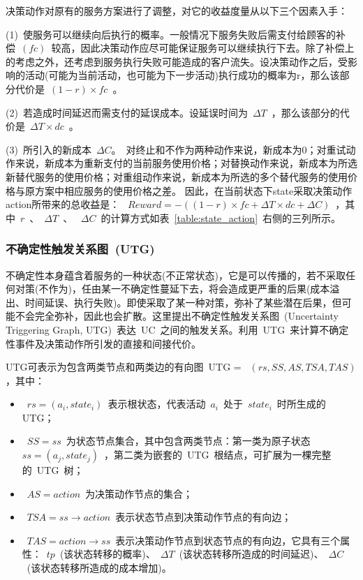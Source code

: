 决策动作对原有的服务方案进行了调整，对它的收益度量从以下三个因素入手：

(1)~使服务可以继续向后执行的概率。一般情况下服务失败后需支付给顾客的补偿~$(fc)$~较高，因此决策动作应尽可能保证服务可以继续执行下去。除了补偿上的考虑之外，还考虑到服务执行失败可能造成的客户流失。设决策动作之后，受影响的活动(可能为当前活动，也可能为下一步活动)执行成功的概率为r，那么该部分代价是~$(1-r) \times fc$~。

(2)~若造成时间延迟而需支付的延误成本。设延误时间为~$\Delta T$~，那么该部分的代价是~$\Delta T \times dc$~。

(3)~所引入的新成本~$\Delta C$。~对终止和不作为两种动作来说，新成本为0；对重试动作来说，新成本为重新支付的当前服务使用价格；对替换动作来说，新成本为所选新替代服务的使用价格；对重组动作来说，新成本为所选的多个替代服务的使用价格与原方案中相应服务的使用价格之差。
因此，在当前状态下state采取决策动作action所带来的总收益是：
~$Reward =  - ((1 - r) \times fc + \Delta T \times dc + \Delta C)$~，其中~$r$~、~$\Delta T$~、 ~$\Delta C$~的计算方式如表~\ref{table:state_action}~右侧的三列所示。

\subsubsection{不确定性触发关系图~(UTG)~}
不确定性本身蕴含着服务的一种状态(不正常状态)，它是可以传播的，若不采取任何对策(不作为)，任由某一不确定性蔓延下去，将会造成更严重的后果(成本溢出、时间延误、执行失败)。即使采取了某一种对策，弥补了某些潜在后果，但可能不会完全弥补，因此也会扩散。这里提出不确定性触发关系图~(Uncertainty Triggering Graph, UTG)~表达~UC~之间的触发关系。利用~UTG~来计算不确定性事件及决策动作所引发的直接和间接代价。

UTG可表示为包含两类节点和两类边的有向图~UTG = ~$(rs, SS, AS, TSA, TAS)$，其中：
\begin{itemize}
\item ~$rs=(a_i, state_i)$~表示根状态，代表活动~$a_i$~处于~$state_i$~时所生成的UTG；
\item ~$SS={ss}$~为状态节点集合，其中包含两类节点：第一类为原子状态~$ss=(a_j, state_j)$~，第二类为嵌套的~UTG~根结点，可扩展为一棵完整的~UTG~树；
\item ~$AS={action}$~为决策动作节点的集合；
\item ~$TSA=ss \to action$~表示状态节点到决策动作节点的有向边；
\item ~$TAS=action \to ss$~表示决策动作节点到状态节点的有向边，它具有三个属性：~$tp$~(该状态转移的概率)、~$\Delta T$~(该状态转移所造成的时间延迟)、~$\Delta C$~(该状态转移所造成的成本增加)。
\end{itemize}

